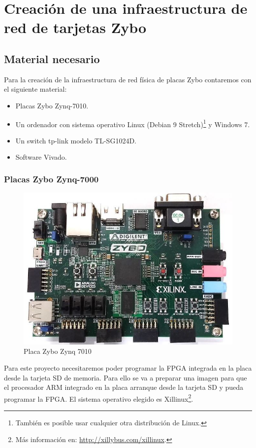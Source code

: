 \section{Creación de una infraestructura de red de tarjetas Zybo}
\hypertarget{CreacionInfraestructura}{}
\subsection{Material necesario}
Para la creación de la infraestructura de red física de placas Zybo contaremos con el siguiente material:
\begin{itemize}
	\item Placas Zybo Zynq-7010.
	\item Un ordenador con sistema operativo Linux (Debian 9 Stretch)\footnote{También es posible usar cualquier otra distribución de Linux.} y Windows 7.
	\item Un switch tp-link modelo TL-SG1024D.
	\item Software Vivado.
\end{itemize}

\subsubsection{Placas Zybo Zynq-7000}
\begin{figure}[h]
	\centering
	\includegraphics[scale=0.5]{Anexos/Anexo2/Infraestructura/zybo.jpg}
	\caption{Placa Zybo Zynq 7010}
	\label{Placa Zybo}
\end{figure}
Para este proyecto necesitaremos poder programar la FPGA integrada en la placa desde la tarjeta SD de memoria. Para ello se va a preparar una imagen para que el procesador ARM integrado en la placa arranque desde la tarjeta SD y pueda programar la FPGA. El sistema operativo elegido es Xillinux\footnote{Más información en: \url{http://xillybus.com/xillinux}.}.

